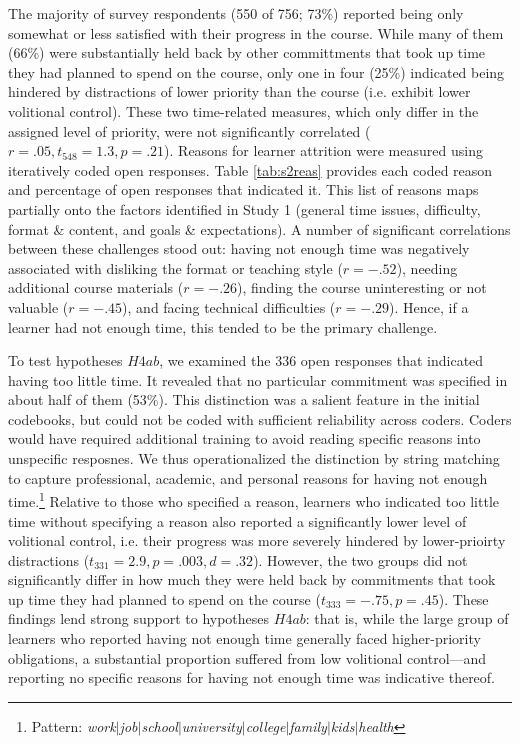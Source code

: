 \documentclass{sigchi}\usepackage[]{graphicx}\usepackage[]{color}
\begin{document}
The majority of survey respondents (550 of 756; 73\%) reported being only somewhat or less satisfied with their progress in the course. While many of them (66\%) were substantially held back by other committments that took up time they had planned to spend on the course, only one in four (25\%) indicated being hindered by distractions of lower priority than the course (i.e. exhibit lower volitional control). These two time-related measures, which only differ in the assigned level of priority, were not significantly correlated ($r=.05, t_{548}=1.3, p=.21$). Reasons for learner attrition were measured using iteratively coded open responses. Table \ref{tab:s2reas} provides each coded reason and percentage of open responses that indicated it. This list of reasons maps partially onto the factors identified in Study 1 (general time issues, difficulty, format \& content, and goals \& expectations). A number of significant correlations between these challenges stood out: having not enough time was negatively associated with disliking the format or teaching style ($r=-.52$), needing additional course materials ($r=-.26$), finding the course uninteresting or not valuable ($r=-.45$), and facing technical difficulties ($r=-.29$). Hence, if a learner had not enough time, this tended to be the primary challenge.

To test hypotheses $H4ab$, we examined the 336 open responses that indicated having too little time. It revealed that no particular commitment was specified in about half of them (53\%). This distinction was a salient feature in the initial codebooks, but could not be coded with sufficient reliability across coders. Coders would have required additional training to avoid reading specific reasons into unspecific resposnes. We thus operationalized the distinction by string matching to capture professional, academic, and personal reasons for having not enough time.\footnote{Pattern: {\em work$|$job$|$school$|$university$|$college$|$family$|$kids$|$health}} Relative to those who specified a reason, learners who indicated too little time without specifying a reason also reported a significantly lower level of volitional control, i.e. their progress was more severely hindered by lower-prioirty distractions ($t_{331}=2.9, p=.003, d=.32$). However, the two groups did not significantly differ in how much they were held back by commitments that took up time they had planned to spend on the course ($t_{333}=-.75, p=.45$). These findings lend strong support to hypotheses $H4ab$: that is, while the large group of learners who reported having not enough time generally faced higher-priority obligations, a substantial proportion suffered from low volitional control---and reporting no specific reasons for having not enough time was indicative thereof.
\end{document}
